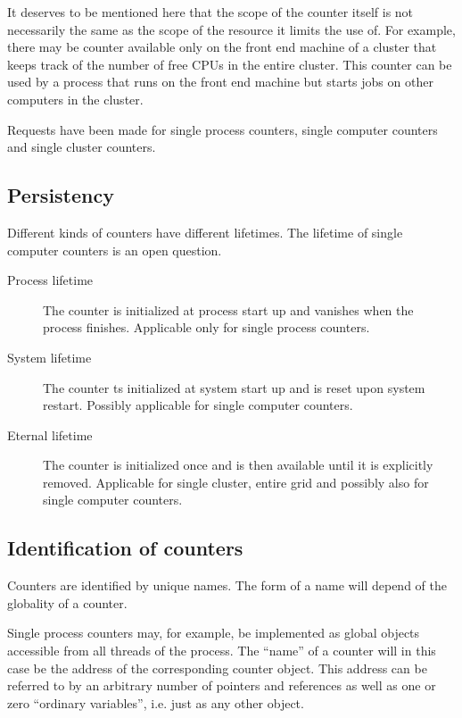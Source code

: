 \documentclass[a4paper,11pt]{article}
\begin{document}
It deserves to be mentioned here that the scope of the counter itself
is not necessarily the same as the scope of the resource it limits the
use of. For example, there may be counter available only on the front
end machine of a cluster that keeps track of the number of free CPUs
in the entire cluster. This counter can be used by a process that runs
on the front end machine but starts jobs on other computers in the
cluster.

Requests have been made for single process counters, single computer
counters and single cluster counters.

\subsection{Persistency}
\label{persistency}

Different kinds of counters have different lifetimes. The lifetime of
single computer counters is an open question.

\begin{description}
\item[Process lifetime] The counter is initialized at process start up
  and vanishes when the process finishes. Applicable only for single
  process counters.
\item[System lifetime] The counter ts initialized at system start up
  and is reset upon system restart. Possibly applicable for single
  computer counters.
\item[Eternal lifetime] The counter is initialized once and is then
  available until it is explicitly removed. Applicable for single
  cluster, entire grid and possibly also for single computer counters.
\end{description}

\subsection{Identification of counters}

Counters are identified by unique names. The form of a name will
depend of the globality of a counter.

Single process counters may, for example, be implemented as global
objects accessible from all threads of the process. The ``name'' of a
counter will in this case be the address of the corresponding counter
object. This address can be referred to by an arbitrary number of
pointers and references as well as one or zero ``ordinary variables'',
i.e. just as any other object.
\end{document}
